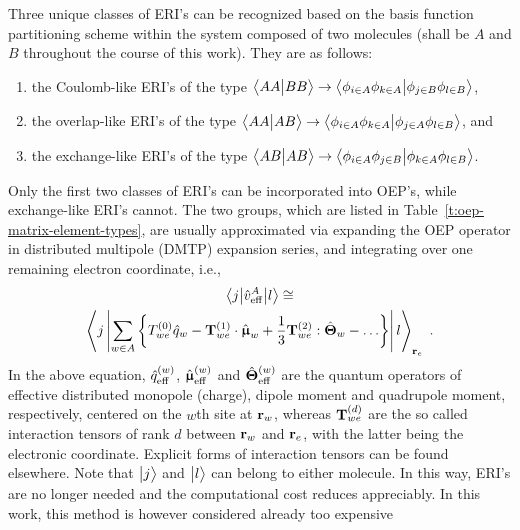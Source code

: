 \documentclass[aip,jcp,amsmath,amssymb,reprint,floatfix]{revtex4-1}
\begin{document}
Three unique classes of ERI's can be recognized 
based on the basis function partitioning scheme
within the system composed of two molecules (shall be $A$ and $B$
throughout the course of this work). 
They are as follows:
%
\begin{enumerate}
\item the Coulomb\hyp{}like ERI's of the type 
$\BraKet{AA}{BB}\rightarrow \BraKet{\phi_{i\in A}\phi_{k\in A}}{\phi_{j\in B}\phi_{l\in B}}$,
\item the overlap\hyp{}like ERI's of the type 
$\BraKet{AA}{AB}\rightarrow \BraKet{\phi_{i\in A}\phi_{k\in A}}{\phi_{j\in A}\phi_{l\in B}}$, and
\item the exchange\hyp{}like ERI's of the type 
$\BraKet{AB}{AB}\rightarrow \BraKet{\phi_{i\in A}\phi_{j\in B}}{\phi_{k\in A}\phi_{l\in B}}$.
\end{enumerate}
%
Only the first two classes of ERI's can be incorporated into OEP's,
while exchange\hyp{}like ERI's cannot. 
The two groups, which are listed in Table~\ref{t:oep-matrix-element-types},
are usually approximated via
expanding the OEP operator in distributed multipole (DMTP) expansion series, and integrating over
one remaining electron coordinate,\cite{Li.Gordon.Jensen.JCP.2006} i.e.,
%
\begin{multline} \label{e:coulomb-energy:dmtp-oei}
 \tBraKet{j}{\hat{v}_{\rm eff}^A}{l} \cong \\
 \left< j \left| 
                   \sum_{w\in A} \left\{
                                 T^{(0)}_{we} \hat{q}_w 
                          - {\bf T}^{(1)}_{we} \cdot \hat{\BM\upmu}_w 
            + \frac{1}{3}   {\bf T}^{(2)}_{we} :     \hat{\BM\Theta}_w 
                    - \ldots  \right\}
              \right| l \right>_{{\bf r}_e} \;.
\end{multline}
%
In the above equation, $\hat{q}_{\rm eff}^{(w)}$,
$\hat{\BM\upmu}^{(w)}_{\rm eff}$ and $\hat{\BM\Theta}^{(w)}_{\rm eff}$
are the quantum operators of effective distributed monopole (charge),
dipole moment and quadrupole moment, respectively, centered on the $w$th site at ${\bf r}_w$, 
whereas ${{\bf T}^{(d)}_{we}}$ are the so called interaction tensors of rank $d$ between ${\bf r}_w$ and ${\bf r}_e$, with the latter being the electronic coordinate.
Explicit forms of interaction tensors can be found elsewhere.\cite{Blasiak.Cho.JCP.2014}
Note that $\Ket{j}$ and $\Ket{l}$ can belong to either molecule.
In this way, ERI's are no longer needed and the computational cost reduces appreciably.
In this work, this method is however considered already too expensive
\end{document}
